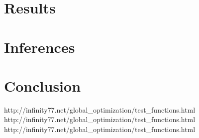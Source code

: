 \documentclass{article}
\begin{document}
\section{Results}\label{results}



\section{Inferences}\label{inferences}


\section{Conclusion}\label{conclusion}


http://infinity77.net/global\_optimization/test\_functions.html
http://infinity77.net/global\_optimization/test\_functions.html
http://infinity77.net/global\_optimization/test\_functions.html


\end{document}

